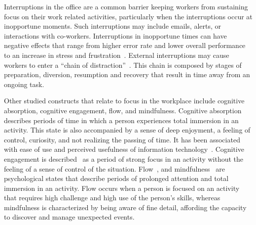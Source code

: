 Interruptions in the office are a common barrier keeping workers from sustaining focus on their work related activities, particularly when the interruptions occur at inopportune moments.
Such interruptions may include emails, alerts, or interactions with co-workers\cite{gonzalez2004constant,chong2006interruptions,shamsi07}. Interruptions in inopportune times can have negative effects that range from higher error rate and lower overall performance
to an increase in stress and frustration~\cite{bailey2001effects,czerwinski2000instant,mark2008cost}.
External interruptions may cause workers to enter a ``chain of distraction''~\cite{shamsi07}.
This chain is composed by stages of preparation, diversion, resumption and recovery that result in time away from an ongoing task. 

Other studied constructs that relate to focus in the workplace include cognitive absorption, cognitive engagement, flow, and mindfulness.
Cognitive absorption describes periods of time in which a person experiences total immersion in an activity.
This state is also accompanied by a sense of deep enjoyment, a feeling of control, curiosity, and not realizing the passing of time.
It has been associated with ease of use and perceived usefulness of information technology~\cite{agarwal00}.
Cognitive engagement is described~\cite{webster97} as a period of strong focus in an activity without the feeling of a sense of control of the situation.
Flow~\cite{Csikszentmihalyi90}, and mindfulness~\cite{Weick06,dane11} are psychological states that describe periods of prolonged attention and total immersion in an activity. Flow occurs when a person is focused on an activity that requires high challenge and high use of the person's skills, whereas mindfulness is characterized by being aware of fine detail, affording the capacity to discover and manage unexpected events.

